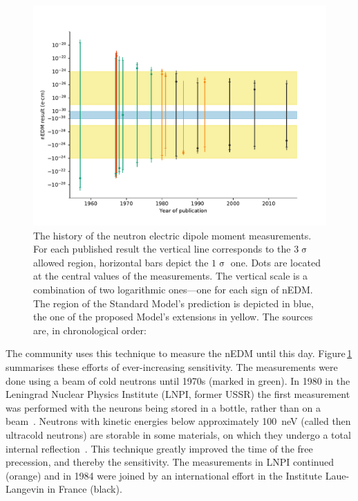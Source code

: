 \begin{figure}
  \centering
  \includegraphics[width=\linewidth]{gfx/introduction/edm_limits.pdf}
  \caption{The history of the neutron electric dipole moment measurements. For each published result the vertical line corresponds to the $3\upsigma$ allowed region, horizontal bars depict the $1\upsigma$ one. Dots are located at the central values of the measurements. The vertical scale is a combination of two logarithmic ones---one for each sign of nEDM. The region of the Standard Model's prediction is depicted in blue, the one of the proposed Model's extensions in yellow. The sources are, in chronological order:~\cite{PhysRev.108.120,PhysRevLett.19.381,PhysRev.170.1200,PhysRev.179.1285,PhysRevD.7.3147,PhysRevD.15.9,ALTAREV1980269,ALTAREV198113,altarev1986search,ALTAREV1992242,PENDLEBURY1984327,SMITH1990191,PhysRevLett.82.904,PhysRevLett.97.131801}}
  \label{fig:nEDM_limits_history}
\end{figure}

The community uses this technique to measure the nEDM until this day. Figure\,\ref{fig:nEDM_limits_history} summarises these efforts of ever-increasing sensitivity. The measurements were done using a beam of cold neutrons until 1970s (marked in green).
In 1980 in the Leningrad Nuclear Physics Institute (LNPI, former USSR) the first measurement was performed with the neurons being stored in a bottle, rather than on a beam~\cite{ALTAREV1980269}. Neutrons with kinetic energies below approximately \SI{100}{\nano\electronvolt} (called then ultracold neutrons) are storable in some materials, on which they undergo a total internal reflection~\cite{UCNbook}. This technique greatly improved the time of the free precession, and thereby the sensitivity. The measurements in LNPI continued (orange) and in 1984 were joined by an international effort in the Institute Laue-Langevin in France (black).

